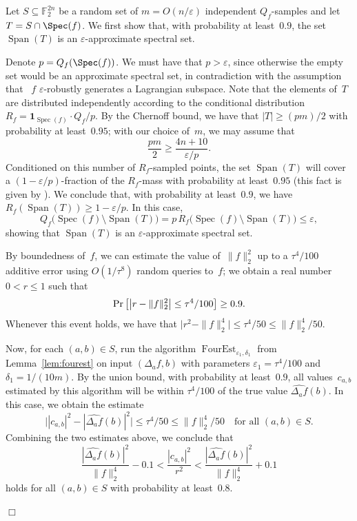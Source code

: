 \documentclass[11pt]{amsart}
\renewcommand{\Pr}{\mathop{\mbox{\rm Pr}}}
\newcommand{\F}{\mathbb{F}} %
\DeclareMathOperator{\vspan}{Span} %
\newcommand{\one}{\mathbf{1}}
\newcommand{\eps}{\varepsilon}
\DeclareMathOperator{\spec}{Spec}
\DeclareMathOperator{\FourEst}{FourEst}
\theoremstyle{plain}
\theoremstyle{definition}
\theoremstyle{remark}
\renewenvironment{proof}[1][]{
    	\begin{trivlist}
     	\item[\hspace{\labelsep}{\em\noindent Proof#1:\/}]}
     	{{\hfill$\Box$}
    	\end{trivlist}
  }
\begin{document}
\begin{proof}
Let $S\subseteq \F_2^{2n}$ be a random set of $m = O(n/\eps)$ independent $Q_f$-samples and let $T = S\cap\Spec(f)$.
We first show that, with probability at least~$0.9$, the set $\vspan(T)$ is an $\eps$-approximate spectral set.

Denote $p = Q_f(\Spec(f))$.
We must have that $p > \eps$, since otherwise the empty set would be an approximate spectral set, in contradiction with the assumption that ~$f$ $\eps$-robustly generates a Lagrangian subspace.
Note that the elements of~$T$ are distributed independently according to the conditional distribution $R_f = \one_{\spec(f)}\cdot Q_f/p$.
By the Chernoff bound, we have that $|T| \geq (pm)/2$ with probability at least~$0.95$;
with our choice of~$m$, we may assume that
$$\frac{pm}{2} \geq \frac{4n+10}{\eps/p}.$$
Conditioned on this number of $R_f$-sampled points, the set $\vspan(T)$ will cover a $(1-\eps/p)$-fraction of the $R_f$-mass with probability at least~$0.95$
(this fact is given by \cite[Lemma~4.21]{chen2024stabilizer}).
We conclude that, with probability at least~$0.9$, we have $R_f(\vspan(T)) \geq 1-\eps/p$.
In this case,
\begin{equation*}
    Q_f\big(\spec(f)\setminus \vspan(T)\big) =
    p\,R_f\big(\spec(f)\setminus \vspan(T)\big)
    \leq
    \eps,
\end{equation*}
showing that $\vspan(T)$ is an $\eps$-approximate spectral set.

By boundedness of~$f$, we can estimate the value of~$\|f\|_2^2$ up to a $\tau^4/100$ additive error using $O(1/\tau^8)$ random queries to~$f$;
we obtain a real number $0<r\leq 1$ such that
$$\Pr\big[ \big|r- \|f\|_2^2\big| \leq \tau^4/100\big] \geq 0.9.$$
Whenever this event holds, we have that $\big|r^2 - \|f\|_2^4\big| \leq \tau^4/50 \leq \|f\|_2^4/50$.

Now, for each $(a,b)\in S$, run the algorithm $\FourEst_{\eps_1,\delta_1}$ from Lemma~\ref{lem:fourest} on input $(\Delta_af, b)$ with parameters $\eps_1 = \tau^4/100$ and $\delta_1 = 1/(10m)$.
By the union bound, with probability at least~$0.9$, all values~$c_{a,b}$ estimated by this algorithm will be within $\tau^4/100$ of the true value $\widehat{\Delta_af}(b)$.
In this case, we obtain the estimate
$$\big||c_{a,b}|^2 - |\widehat{\Delta_af}(b)|^2\big| \leq \tau^4/50 \leq \|f\|_2^4/50 \quad \text{for all $(a,b) \in S$.}$$
Combining the two estimates above, we conclude that
$$\frac{|\widehat{\Delta_af}(b)|^2}{\|f\|_2^4} - 0.1 < \frac{|c_{a,b}|^2}{r^2} < \frac{|\widehat{\Delta_af}(b)|^2}{\|f\|_2^4} + 0.1$$
holds for all $(a,b)\in S$ with probability at least~$0.8$.


\end{proof}
\end{document}
